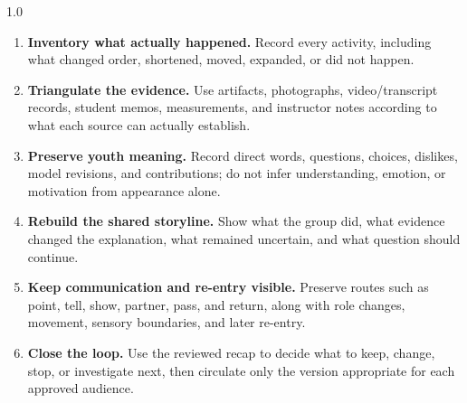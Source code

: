\newpage

\begin{spacing}{1.0}
\begin{enumerate}
  \item \textbf{Inventory what actually happened.} Record every activity, including what changed order, shortened, moved, expanded, or did not happen.
  \item \textbf{Triangulate the evidence.} Use artifacts, photographs, video/transcript records, student memos, measurements, and instructor notes according to what each source can actually establish.
  \item \textbf{Preserve youth meaning.} Record direct words, questions, choices, dislikes, model revisions, and contributions; do not infer understanding, emotion, or motivation from appearance alone.
  \item \textbf{Rebuild the shared storyline.} Show what the group did, what evidence changed the explanation, what remained uncertain, and what question should continue.
  \item \textbf{Keep communication and re-entry visible.} Preserve routes such as point, tell, show, partner, pass, and return, along with role changes, movement, sensory boundaries, and later re-entry.
  \item \textbf{Close the loop.} Use the reviewed recap to decide what to keep, change, stop, or investigate next, then circulate only the version appropriate for each approved audience.
\end{enumerate}
\end{spacing}


\renewcommand{\arraystretch}{1.08}
\setlength{\tabcolsep}{4pt}

